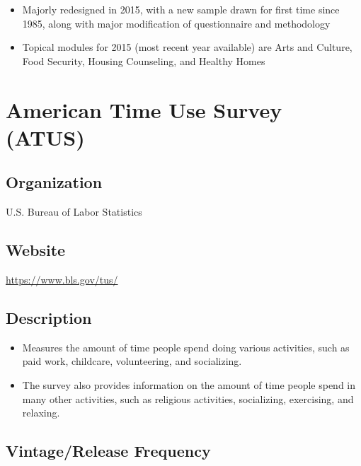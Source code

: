 \documentclass[
]{book}
\providecommand{\tightlist}{%
  \setlength{\itemsep}{0pt}\setlength{\parskip}{0pt}}
\begin{document}
\begin{itemize}
\tightlist
\item
  Majorly redesigned in 2015, with a new sample drawn for first time since 1985, along with major modification of questionnaire and methodology
\item
  Topical modules for 2015 (most recent year available) are Arts and Culture, Food Security, Housing Counseling, and Healthy Homes
\end{itemize}

\mainmatter

\hypertarget{american-time-use-survey-atus}{%
\chapter{American Time Use Survey (ATUS)}\label{american-time-use-survey-atus}}

\hypertarget{organization-7}{%
\section{Organization}\label{organization-7}}

U.S. Bureau of Labor Statistics

\hypertarget{website-7}{%
\section{Website}\label{website-7}}

\url{https://www.bls.gov/tus/}

\hypertarget{description-7}{%
\section{Description}\label{description-7}}

\begin{itemize}
\tightlist
\item
  Measures the amount of time people spend doing various activities, such as paid work, childcare, volunteering, and socializing.
\item
  The survey also provides information on the amount of time people spend in many other activities, such as religious activities, socializing, exercising, and relaxing.
\end{itemize}

\hypertarget{vintagerelease-frequency-7}{%
\section{Vintage/Release Frequency}\label{vintagerelease-frequency-7}}
\end{document}
